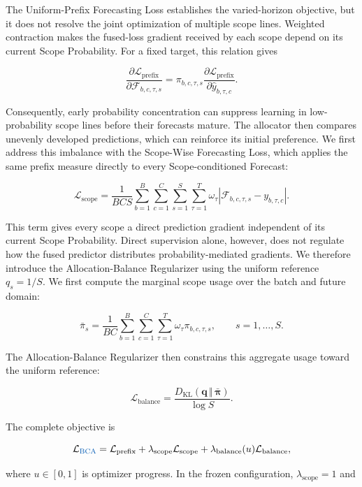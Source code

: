\documentclass[final,3p,times]{elsarticle}
\begin{document}
The Uniform-Prefix Forecasting Loss establishes the varied-horizon objective, but it does not resolve the joint optimization of multiple scope lines. Weighted contraction makes the fused-loss gradient received by each scope depend on its current Scope Probability. For a fixed target, this relation gives

\[
\frac{
\partial\mathcal L_{\mathrm{prefix}}
}{
\partial\mathcal F_{b,c,\tau,s}
}
=
\pi_{b,c,\tau,s}
\frac{
\partial\mathcal L_{\mathrm{prefix}}
}{
\partial\widehat y_{b,\tau,c}
}.
\]


Consequently, early probability concentration can suppress learning in low-probability scope lines before their forecasts mature. The allocator then compares unevenly developed predictions, which can reinforce its initial preference. We first address this imbalance with the Scope-Wise Forecasting Loss, which applies the same prefix measure directly to every Scope-conditioned Forecast:

\[
\mathcal L_{\mathrm{scope}}
=
\frac{1}{BCS}
\sum_{b=1}^{B}
\sum_{c=1}^{C}
\sum_{s=1}^{S}
\sum_{\tau=1}^{T}
\omega_\tau
\left|
\mathcal F_{b,c,\tau,s}-y_{b,\tau,c}
\right|.
\]


This term gives every scope a direct prediction gradient independent of its current Scope Probability. Direct supervision alone, however, does not regulate how the fused predictor distributes probability-mediated gradients. We therefore introduce the Allocation-Balance Regularizer using the uniform reference $q_s=1/S$. We first compute the marginal scope usage over the batch and future domain:

\[
\bar{\pi}_s
=
\frac{1}{BC}
\sum_{b=1}^{B}
\sum_{c=1}^{C}
\sum_{\tau=1}^{T}
\omega_\tau\pi_{b,c,\tau,s},
\qquad
s=1,\ldots,S.
\]


The Allocation-Balance Regularizer then constrains this aggregate usage toward the uniform reference:

\[
\mathcal L_{\mathrm{balance}}
=
\frac{
D_{\mathrm{KL}}\!\left(
\mathbf q\,\Vert\,\bar{\boldsymbol\pi}
\right)
}{
\log S
}.
\]


The complete objective is

\[
\mathcal L_{\textcolor{revisionblue}{\mathrm{BCA}}}
=
\mathcal L_{\mathrm{prefix}}
+
\lambda_{\mathrm{scope}}
\mathcal L_{\mathrm{scope}}
+
\lambda_{\mathrm{balance}}(u)
\mathcal L_{\mathrm{balance}},
\]


where $u\in[0,1]$ is optimizer progress. In the frozen configuration, $\lambda_{\mathrm{scope}}=1$ and
\end{document}
